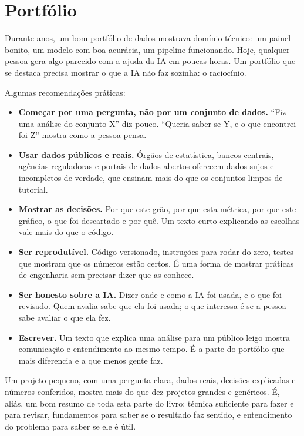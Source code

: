 
\section{Portfólio}
\label{sec:portfolio}

Durante anos, um bom portfólio de dados mostrava domínio técnico: um painel bonito, um
modelo com boa acurácia, um pipeline funcionando. Hoje, qualquer pessoa gera algo
parecido com a ajuda da IA em poucas horas. Um portfólio que se destaca precisa mostrar o
que a IA não faz sozinha: o raciocínio.

Algumas recomendações práticas:

\begin{itemize}
  \item \textbf{Começar por uma pergunta, não por um conjunto de dados.} \enquote{Fiz uma
    análise do conjunto X} diz pouco. \enquote{Queria saber se Y, e o que encontrei foi Z}
    mostra como a pessoa pensa.
  \item \textbf{Usar dados públicos e reais.} Órgãos de estatística, bancos centrais,
    agências reguladoras e portais de dados abertos oferecem dados sujos e incompletos de
    verdade, que ensinam mais do que os conjuntos limpos de tutorial.
  \item \textbf{Mostrar as decisões.} Por que este grão, por que esta métrica, por que
    este gráfico, o que foi descartado e por quê. Um texto curto explicando as escolhas vale
    mais do que o código.
  \item \textbf{Ser reprodutível.} Código versionado, instruções para rodar do zero,
    testes que mostram que os números estão certos. É uma forma de mostrar práticas de
    engenharia sem precisar dizer que as conhece.
  \item \textbf{Ser honesto sobre a IA.} Dizer onde e como a IA foi usada, e o que foi
    revisado. Quem avalia sabe que ela foi usada; o que interessa é se a pessoa sabe
    avaliar o que ela fez.
  \item \textbf{Escrever.} Um texto que explica uma análise para um público leigo mostra
    comunicação e entendimento ao mesmo tempo. É a parte do portfólio que mais diferencia
    e a que menos gente faz.
\end{itemize}

Um projeto pequeno, com uma pergunta clara, dados reais, decisões explicadas e números
conferidos, mostra mais do que dez projetos grandes e genéricos. É, aliás, um bom resumo de
toda esta parte do livro: técnica suficiente para fazer e para revisar, fundamentos para
saber se o resultado faz sentido, e entendimento do problema para saber se ele é útil.

